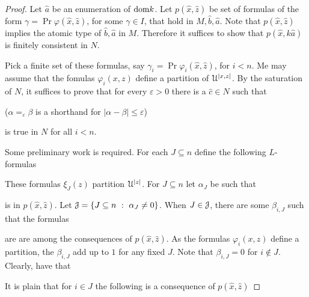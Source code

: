 \documentclass[10pt,oneside]{amsproc}
\begin{document}
\begin{proof}
  Let $\hat a$ be an enumeration of ${\rm dom} k$.
  Let $p(\hat x,\hat z)$ be set of formulas of the form $\gamma=\Pr\varphi(\hat x,\hat z)$, for some $\gamma\in I$, that hold in $M,\hat b,\hat a$.
  Note that $p(\hat x,\hat z)$ implies the atomic type of $\hat b,\hat a$ in $M$.
  Therefore it suffices to show that $p(\hat x,k\hat a)$ is finitely consistent in $N$.

  Pick a finite set of these formulas, say $\gamma_i=\Pr\varphi_i(\hat x,\hat z)$, for $i<n$.
  Me may assume that the fomulas $\varphi_i(x,z)$ define a partition of ${\EuScript U}^{|x,z|}$.
  By the saturation of $N$, it suffices to prove that for every $\varepsilon>0$ there is a $\hat c\in N$ such that
  
  \hfill ($\alpha=_\varepsilon\beta$ is a shorthand for $|\alpha-\beta|\le\varepsilon$)
  
  is true in $N$ for all $i<n$.
  
  Some preliminary work is required.
  For each $J\subseteq n$ define the following $L$-formulas


  These formulas $\xi_J(z)$ partition ${\EuScript U}^{|z|}$.
  For $J\subseteq n$ let $\alpha_J$ be such that 
  
  
  is in $p(\hat x,\hat z)$.
  Let ${\EuScript J}=\{J\subseteq n\ :\ \alpha_J\neq0\}$. 
  When $J\in{\EuScript J}$, there are some $\beta_{i,J}$ such that the formulas


  are are among the consequences of $p(\hat x,\hat z)$.
  As the formulas $\varphi_i(x,z)$ define a partition, the $\beta_{i,J}$ add up to $1$ for any fixed $J$.
  Note that $\beta_{i,J}=0$ for $i\notin J$.
  Clearly, have that 


  It is plain that for $i\in J$ the following is a consequence of $p(\hat x,\hat z)$



\end{proof}
\end{document}

